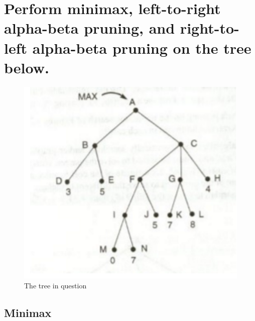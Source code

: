 \documentclass[11pt]{article}
\begin{document}
\section{Perform minimax, left-to-right alpha-beta pruning, and right-to-left alpha-beta pruning on the tree below.}

\begin{figure}[H]
\centering
\includegraphics[scale=.5]{btree.png}
\caption{The tree in question}
\end{figure}

\subsection{Minimax}
\end{document}
